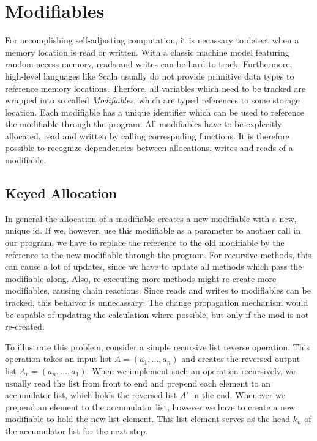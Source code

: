 \section{Modifiables}


For accomplishing self-adjusting computation, it is necassary to detect when a memory location is read or written. With a classic machine model featuring random access memory, reads and writes can be hard to track. Furthermore, high-level languages like Scala usually do not provide primitive data types to reference memory locations. Therfore, all variables which need to be tracked are wrapped into so called \textit{Modifiables}, which are typed references to some storage location. Each modifiable has a unique identifier which can be used to reference the modifiable through the program. All modifiables have to be explecitly allocated, read and written by calling correspnding functions. It is therefore possible to recognize dependencies between allocations, writes and reads of a modifiable. 

\subsection{Keyed Allocation}
\label{sec:keyed_alloc}

In general the allocation of a modifiable creates a new modifiable with a new, unique id. If we, however, use this modifiable as a parameter to another call in our program, we have to replace the reference to the old modifiable by the reference to the new modifiable through the program. For recursive methods, this can cause a lot of updates, since we have to update all methods which pass the modifiable along. Also, re-executing more methods might re-create more modifiables, causing chain reactions. 
Since reads and writes to modifiables can be tracked, this behaivor is unnecassary: The change propagation mechanism would be capable of updating the calculation where possible, but only if the mod is not re-created. 

To illustrate this problem, consider a simple recursive list reverse operation. This operation takes an input list $A = (a_1, ..., a_n)$ and creates the reversed output list $A_r = (a_n, ..., a_1)$. When we implement such an operation recursively, we usually read the list from front to end and prepend each element to an accumulator list, which holds the reversed list $A'$ in the end. Whenever we prepend an element to the accumulator list, however we have to create a new modifiable to hold the new list element. This list element serves as the head $k_n$ of the accumulator list for the next step.  

